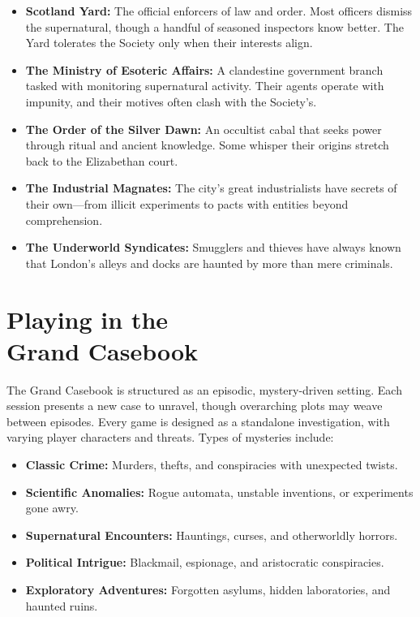 \begin{itemize}
    \item \textbf{Scotland Yard:} The official enforcers of law and order. Most officers dismiss the supernatural, though a handful of seasoned inspectors know better. The Yard tolerates the Society only when their interests align.
    
    \item \textbf{The Ministry of Esoteric Affairs:} A clandestine government branch tasked with monitoring supernatural activity. Their agents operate with impunity, and their motives often clash with the Society’s.
    
    \item \textbf{The Order of the Silver Dawn:} An occultist cabal that seeks power through ritual and ancient knowledge. Some whisper their origins stretch back to the Elizabethan court.
    
    \item \textbf{The Industrial Magnates:} The city’s great industrialists have secrets of their own—from illicit experiments to pacts with entities beyond comprehension.
    
    \item \textbf{The Underworld Syndicates:} Smugglers and thieves have always known that London’s alleys and docks are haunted by more than mere criminals.
\end{itemize}

\section[Playing in the Grand Casebook]{Playing in the\\ Grand Casebook}

The Grand Casebook is structured as an episodic, mystery-driven setting. Each session presents a new case to unravel, though overarching plots may weave between episodes. Every game is designed as a standalone investigation, with varying player characters and threats. Types of mysteries include:

\begin{itemize}
    \item \textbf{Classic Crime:} Murders, thefts, and conspiracies with unexpected twists.
    \item \textbf{Scientific Anomalies:} Rogue automata, unstable inventions, or experiments gone awry.
    \item \textbf{Supernatural Encounters:} Hauntings, curses, and otherworldly horrors.
    \item \textbf{Political Intrigue:} Blackmail, espionage, and aristocratic conspiracies.
    \item \textbf{Exploratory Adventures:} Forgotten asylums, hidden laboratories, and haunted ruins.
\end{itemize}

